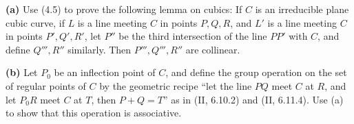 \textbf{(a)} Use (4.5) to prove the following lemma on cubics: If $C$ is an irreducible plane cubic curve, if $L$ is a line meeting $C$ in points $P, Q, R$, and $L'$ is a line meeting $C$ in points $P', Q', R'$, let $P''$ be the third intersection of the line $PP'$ with $C$, and define $Q''', R''$ similarly. Then $P''', Q''', R''$ are collinear.

\textbf{(b)} Let $P_0$ be an inflection point of $C$, and define the group operation on the set of regular points of $C$ by the geometric recipe ``let the line $PQ$ meet $C$ at $R$, and let $P_0R$ meet $C$ at $T$, then $P + Q = T$'' as in (II, 6.10.2) and (II, 6.11.4). Use (a) to show that this operation is associative.
